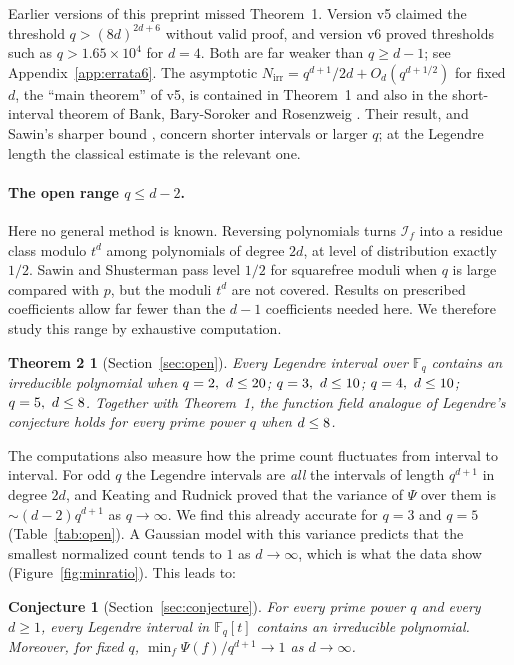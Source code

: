 \documentclass[11pt,a4paper]{article}
\newtheorem*{theoremB}{Theorem 2}
\newtheorem*{conjectureA}{Conjecture}
\theoremstyle{definition}
\theoremstyle{remark}
\newcommand{\Fq}{\mathbb{F}_q}
\newcommand{\Nirr}{N_{\mathrm{irr}}}
\newcommand{\cI}{\mathcal{I}}
\begin{document}
Earlier versions of this preprint missed Theorem~1. Version v5 claimed the threshold
$q>(8d)^{2d+6}$ without valid proof, and version v6 proved thresholds such as
$q>1.65\times10^4$ for $d=4$. Both are far weaker than $q\ge d-1$; see Appendix~\ref{app:errata6}.
The asymptotic $\Nirr=q^{d+1}/2d+O_d(q^{d+1/2})$ for fixed $d$, the ``main theorem'' of v5, is
contained in Theorem~1 and also in the short-interval theorem of Bank, Bary-Soroker and
Rosenzweig \cite{BBR2015}. Their result, and Sawin's sharper bound \cite{Sawin2021}, concern
shorter intervals or larger $q$; at the Legendre length the classical estimate is the relevant one.

\paragraph{The open range $q\le d-2$.}
Here no general method is known. Reversing polynomials turns $\cI_f$ into a residue class modulo
$t^{d}$ among polynomials of degree $2d$, at level of distribution exactly $1/2$. Sawin and
Shusterman \cite{SawinShusterman2022} pass level $1/2$ for squarefree moduli when $q$ is large
compared with $p$, but the moduli $t^d$ are not covered. Results on prescribed coefficients
\cite{Pollack2013,Ha2016} allow far fewer than the $d-1$ coefficients needed here.
We therefore study this range by exhaustive computation.

\begin{theoremB}[Section~\ref{sec:open}]
Every Legendre interval over $\Fq$ contains an irreducible polynomial when
$q=2,\ d\le\VerTwo$; $q=3,\ d\le\VerThree$; $q=4,\ d\le\VerFour$; $q=5,\ d\le\VerFive$.
Together with Theorem~1, the function field analogue of Legendre's conjecture holds for
every prime power $q$ when $d\le8$.
\end{theoremB}

The computations also measure how the prime count fluctuates from interval to interval.
For odd $q$ the Legendre intervals are \emph{all} the intervals of length $q^{d+1}$ in degree
$2d$, and Keating and Rudnick \cite{KR2014} proved that the variance of $\Psi$ over them is
$\sim(d-2)q^{d+1}$ as $q\to\infty$. We find this already accurate for $q=3$ and $q=5$
(Table~\ref{tab:open}). A Gaussian model with this variance predicts that the smallest
normalized count tends to $1$ as $d\to\infty$, which is what the data show (Figure~\ref{fig:minratio}).
This leads to:

\begin{conjectureA}[Section~\ref{sec:conjecture}]
For every prime power $q$ and every $d\ge1$, every Legendre interval in $\Fq[t]$ contains an
irreducible polynomial. Moreover, for fixed $q$,
$\min_{f}\Psi(f)/q^{d+1}\to1$ as $d\to\infty$.
\end{conjectureA}
\end{document}
